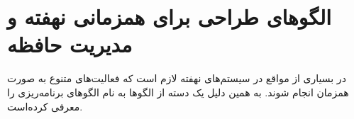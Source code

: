 \section{الگوهای طراحی برای همزمانی نهفته و مدیریت حافظه}
\begin{RTL}
در بسیاری از مواقع در سیستم‌های نهفته لازم است که فعالیت‌های متنوع به صورت همزمان
انجام شوند. به همین دلیل 
\cite{ref1} یک دسته از الگوها به نام الگوهای برنامه‌ریزی
را معرفی کرده‌است.
\end{RTL}
